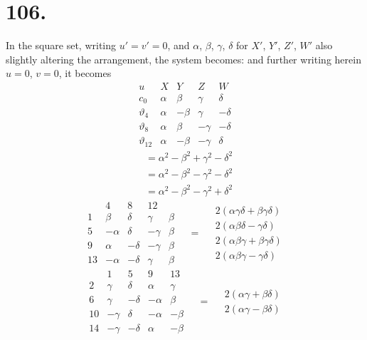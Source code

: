\documentclass[11pt,a4paper]{article}
\newcommand{\uth}[1]{\vartheta_{#1}}
\begin{document}
\newpage
\section*{106.}
\label{sec:106}

In the square set, writing $u' = v' = 0$, and $\alpha$, $\beta$, $\gamma$, $\delta$ for $X'$, $Y'$, $Z'$, $W'$ also slightly altering the arrangement, the system becomes: and further writing herein $u = 0$, $v = 0$, it becomes
\[
\begin{array}{c|cccc}
u & X & Y & Z & W \\
\hline
c_0 & \alpha & \beta & \gamma & \delta \\
\uth{4} & \alpha & -\beta & \gamma & -\delta \\
\uth{8} & \alpha & \beta & -\gamma & -\delta \\
\uth{12} & \alpha & -\beta & -\gamma & \delta
\end{array}
\]
\[
\begin{array}{c|c}
& = \alpha^2 - \beta^2 + \gamma^2 - \delta^2 \\
& = \alpha^2 - \beta^2 - \gamma^2 - \delta^2 \\
& = \alpha^2 - \beta^2 - \gamma^2 + \delta^2
\end{array}
\]
\[
\begin{array}{c|cccc}
& 4 & 8 & 12 & \\
\hline
1 & \beta & \delta & \gamma & \beta \\
5 & -\alpha & \delta & -\gamma & \beta \\
9 & \alpha & -\delta & -\gamma & \beta \\
13 & -\alpha & -\delta & \gamma & \beta
\end{array}
\quad = \quad
\begin{array}{l}
2(\alpha\gamma\delta + \beta\gamma\delta) \\
2(\alpha\beta\delta - \gamma\delta) \\
2(\alpha\beta\gamma + \beta\gamma\delta) \\
2(\alpha\beta\gamma - \gamma\delta)
\end{array}
\]
\[
\begin{array}{c|cccc}
& 1 & 5 & 9 & 13 \\
\hline
2 & \gamma & \delta & \alpha & \gamma \\
6 & \gamma & -\delta & -\alpha & \beta \\
10 & -\gamma & \delta & -\alpha & -\beta \\
14 & -\gamma & -\delta & \alpha & -\beta
\end{array}
\quad = \quad
\begin{array}{l}
2(\alpha\gamma + \beta\delta) \\
2(\alpha\gamma - \beta\delta)
\end{array}
\]
\end{document}
